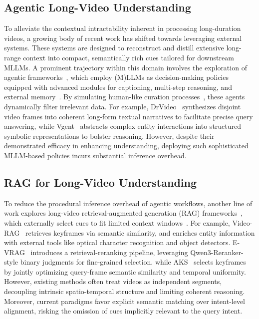 \subsection{Agentic Long-Video Understanding}
To alleviate the contextual intractability inherent in processing long-duration videos, a growing body of recent work has shifted towards leveraging external systems. These systems are designed to reconstruct and distill extensive long-range context into compact, semantically rich cues tailored for downstream MLLMs. A prominent trajectory within this domain involves the exploration of agentic frameworks~\cite{mmvid,omagent}, which employ (M)LLMs as decision-making policies equipped with advanced modules for captioning, multi-step reasoning, and external memory~\cite{VideoMem}. By simulating human-like curation processes~\cite{vamos,morevqa}, these agents dynamically filter irrelevant data. For example, DrVideo~\cite{drvideo} synthesizes disjoint video frames into coherent long-form textual narratives to facilitate precise query answering, while Vgent~\cite{vgent} abstracts complex entity interactions into structured symbolic representations to bolster reasoning. However, despite their demonstrated efficacy in enhancing understanding, deploying such sophisticated MLLM-based policies incurs substantial inference overhead.

\subsection{RAG for Long-Video Understanding}
{To reduce the procedural inference overhead of agentic workflows, another line of work explores long-video retrieval-augmented generation (RAG) frameworks~\cite{exvideorag,xue2025omni,zeng2025scenerag}, which externally select cues to fit limited context windows~\cite{videorag,TVRAG,FOCUS}. For example, Video-RAG~\cite{Video-RAG} retrieves keyframes via semantic similarity, and enriches entity information with external tools like optical character recognition and object detectors. E-VRAG~\cite{evrag} introduces a retrieval-reranking pipeline, leveraging Qwen3-Reranker-style binary judgments for fine-grained selection. while AKS~\cite{AKS} selects keyframes by jointly optimizing query-frame semantic similarity and temporal uniformity. However, existing methods often treat videos as independent segments, decoupling intrinsic spatio-temporal structure and limiting coherent reasoning. Moreover, current paradigms favor explicit semantic matching over intent-level alignment, risking the omission of cues implicitly relevant to the query intent.}

